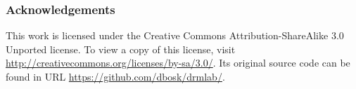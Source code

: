 \subsubsection*{Acknowledgements}

This work is licensed under the Creative Commons Attribution-ShareAlike 3.0 
Unported license.
To view a copy of this license, visit 
\url{http://creativecommons.org/licenses/by-sa/3.0/}.
Its original source code can be found in URL 
\url{https://github.com/dbosk/drmlab/}.


\printbibliography
